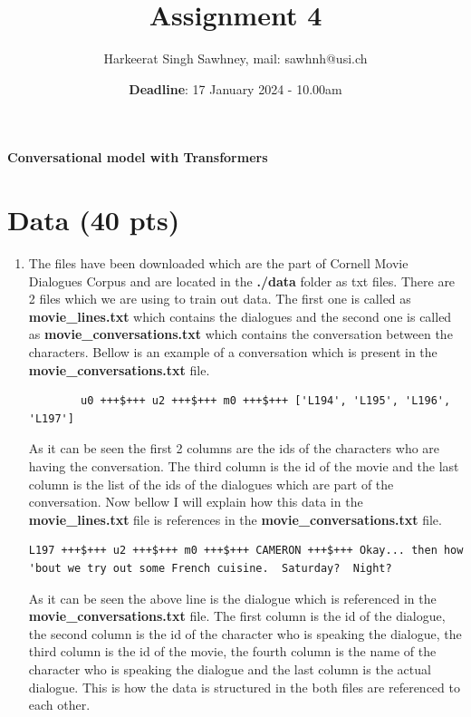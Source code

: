 \documentclass[a4paper]{article}
\title{Assignment 4}
\date{\textbf{Deadline}: 17 January 2024 - 10.00am}
\author{Harkeerat Singh Sawhney, mail: sawhnh@usi.ch}
\begin{document}
\maketitle

\begin{center}
    \Large
    \textbf{Conversational model with Transformers}
\end{center}


\section{Data (40 pts)}

\begin{enumerate}
    \item The files have been downloaded which are the part of Cornell Movie Dialogues Corpus and are located in the \textbf{./data} folder as txt files. There are 2 files which we are using to train out data. The first one is called as \textbf{movie\_lines.txt} which contains the dialogues and the second one is called as \textbf{movie\_conversations.txt} which contains the conversation between the characters. Bellow is an example of a conversation which is present in the \textbf{movie\_conversations.txt} file.

          \begin{lstlisting}
        u0 +++$+++ u2 +++$+++ m0 +++$+++ ['L194', 'L195', 'L196', 'L197']
\end{lstlisting}

          As it can be seen the first 2 columns are the ids of the characters who are having the conversation. The third column is the id of the movie and the last column is the list of the ids of the dialogues which are part of the conversation. Now bellow I will explain how this data in the \textbf{movie\_lines.txt} file is references in the \textbf{movie\_conversations.txt} file.

          \begin{lstlisting}
L197 +++$+++ u2 +++$+++ m0 +++$+++ CAMERON +++$+++ Okay... then how 'bout we try out some French cuisine.  Saturday?  Night?
\end{lstlisting}

          As it can be seen the above line is the dialogue which is referenced in the \textbf{movie\_conversations.txt} file. The first column is the id of the dialogue, the second column is the id of the character who is speaking the dialogue, the third column is the id of the movie, the fourth column is the name of the character who is speaking the dialogue and the last column is the actual dialogue. This is how the data is structured in the both files are referenced to each other.


\end{enumerate}
\end{document}
